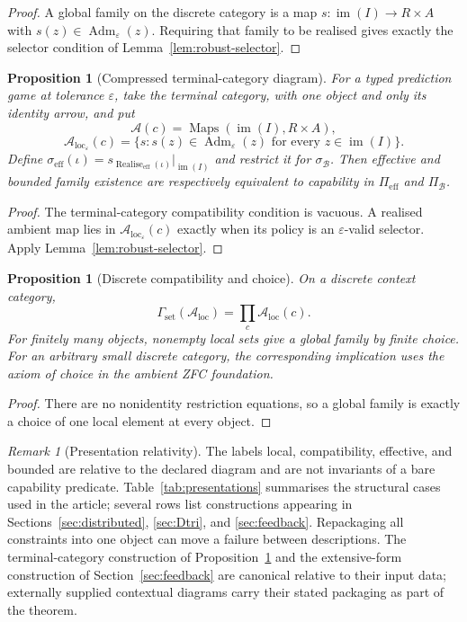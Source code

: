 \documentclass[11pt]{article}
\theoremstyle{plain}
\newtheorem{proposition}[theorem]{Proposition}
\theoremstyle{definition}
\theoremstyle{remark}
\newtheorem{remark}[theorem]{Remark}
\newcommand{\im}{\operatorname{im}}
\newcommand{\Adm}{\operatorname{Adm}}
\newcommand{\realise}{\operatorname{Realise}}
\newcommand{\LocalAdm}{\mathcal{A}_{\mathrm{loc}}}
\newcommand{\eps}{\varepsilon}
\begin{document}
\begin{proof}
A global family on the discrete category is a map
$s:\im(I)\to R\times A$ with $s(z)\in\Adm_\eps(z)$. Requiring that family to be
realised gives exactly the selector condition of
Lemma~\ref{lem:robust-selector}.
\end{proof}

\begin{proposition}[Compressed terminal-category diagram]\label{prop:reduction}
For a typed prediction game at tolerance $\eps$, take the terminal category, with one object and only its identity arrow, and
put
\[
\mathcal A(c)=\operatorname{Maps}(\im(I),R\times A),
\]
\[
\LocalAdm_\eps(c)=
\{s:s(z)\in\Adm_\eps(z)\text{ for every }z\in\im(I)\}.
\]
Define
$\sigma_{\mathrm{eff}}(\iota)=
s_{\realise_{\mathrm{eff}}(\iota)}|_{\im(I)}$ and restrict it for
$\sigma_{\mathcal B}$. Then effective and bounded family existence are
respectively equivalent to capability in $\Pi_{\mathrm{eff}}$ and
$\Pi_{\mathcal B}$.
\end{proposition}

\begin{proof}
The terminal-category compatibility condition is vacuous. A realised ambient map lies
in $\LocalAdm_\eps(c)$ exactly when its policy is an $\eps$-valid selector.
Apply Lemma~\ref{lem:robust-selector}.
\end{proof}

\begin{proposition}[Discrete compatibility and choice]\label{prop:discreteVanishing}
On a discrete context category,
\[
\Gamma_{\mathrm{set}}(\LocalAdm)=\prod_c\LocalAdm(c).
\]
For finitely many objects, nonempty local sets give a global family by finite
choice. For an arbitrary small discrete category, the corresponding implication
uses the axiom of choice in the ambient ZFC foundation.
\end{proposition}

\begin{proof}
There are no nonidentity restriction equations, so a global family is exactly a
choice of one local element at every object.
\end{proof}

\begin{remark}[Presentation relativity]\label{rem:presentation}
The labels local, compatibility, effective, and bounded are relative to the
declared diagram and are not invariants of a bare capability predicate. Table~\ref{tab:presentations} summarises the structural cases used in the article; several rows list constructions appearing in Sections~\ref{sec:distributed}, \ref{sec:Dtri}, and \ref{sec:feedback}. Repackaging all constraints into one object can move a failure
between descriptions. The terminal-category construction of Proposition~\ref{prop:reduction} and the extensive-form
construction of Section~\ref{sec:feedback} are canonical relative to their input
data; externally supplied contextual diagrams carry their stated packaging as
part of the theorem.
\end{remark}
\end{document}
